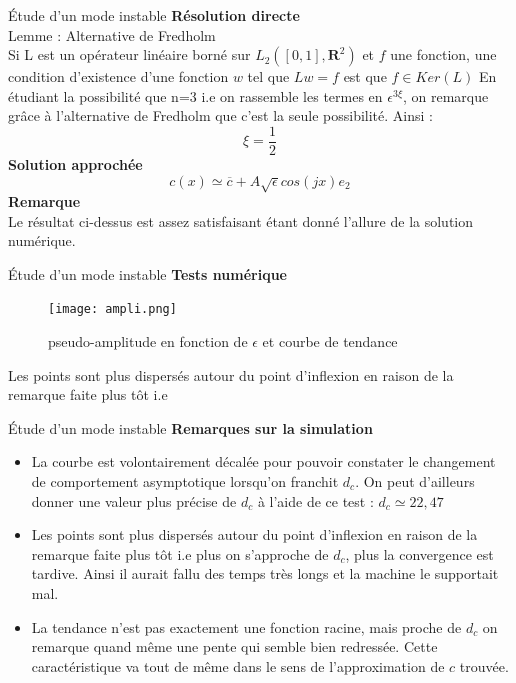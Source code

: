 \documentclass{beamer}
\begin{document}
\begin{frame}{\'Etude d'un mode instable}
\textbf{Résolution directe}\\
Lemme : Alternative de Fredholm\\
Si L est un opérateur linéaire borné sur $L_2([0,1],\mathbf{R} ^2)$ et $f$ une fonction, une condition d'existence d'une fonction $w$ tel que $Lw=f$ est que $f\in Ker(L)$
\newline 
\newline En étudiant la possibilité que n=3 i.e on rassemble les termes en $\epsilon^{3\xi}$, on remarque grâce à l'alternative de Fredholm que c'est la seule possibilité. Ainsi :
\begin{equation}
    \xi=\frac{1}{2}
\end{equation}
\textbf{Solution approchée}
\begin{equation}
c(x)\simeq\overline{c} + A \sqrt{\epsilon} cos(jx)e_2
\end{equation}
\textbf{Remarque}\\
Le résultat ci-dessus est assez satisfaisant étant donné l'allure de la solution numérique.
\end{frame}

\begin{frame}{\'Etude d'un mode instable}
\textbf{Tests numérique}\\
\begin{figure}
\texttt{[image: ampli.png]}
\caption{\label{fig:graph4} pseudo-amplitude en fonction de $\epsilon$ et courbe de tendance}
\end{figure}
Les points sont plus dispersés autour du point d'inflexion en raison de la remarque faite plus tôt i.e 
\end{frame}

\begin{frame}{\'Etude d'un mode instable}
\textbf{Remarques sur la simulation}\\
\begin{itemize}
    \item La courbe est volontairement décalée pour pouvoir constater le changement de comportement asymptotique lorsqu'on franchit $d_c$. On peut d'ailleurs donner une valeur plus précise de $d_c$ à l'aide de ce test : $d_c\simeq 22,47$
    \item Les points sont plus dispersés autour du point d'inflexion en raison de la remarque faite plus tôt i.e plus on s'approche de $d_c$, plus la convergence est tardive. Ainsi il aurait fallu des temps très longs et la machine le supportait mal.
    \item La tendance n'est pas exactement une fonction racine, mais proche de $d_c$ on remarque quand même une pente qui semble bien redressée. Cette caractéristique va tout de même dans le sens de l'approximation de $c$ trouvée.
\end{itemize}
\end{frame}

\end{document}
